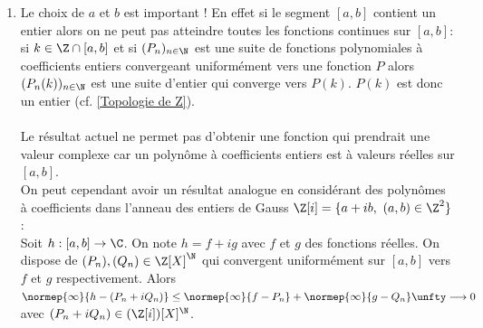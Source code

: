 \documentclass{book}
\begin{document}
\begin{enumerate}[leftmargin=*]
		\textit{Remarque : on aurait pu formuler la réponse à l'aide du théorème de la double limite.}
		\item Le choix de $a$ et $b$ est important ! En effet si le segment $[a,b]$ contient un entier alors on ne peut pas atteindre toutes les fonctions continues sur $[a,b]$:\\
		si $k\in \Z\cap[a,b]$ et si $(P_n)_{n\in \N}$ est une suite de fonctions polynomiales à coefficients entiers convergeant uniformément vers une fonction $P$ alors $(P_n(k))_{n\in \N}$ est une suite d'entier qui converge vers $P(k)$. $P(k)$ est donc un entier (cf. \ref{Topologie de Z}).\\\\
		Le résultat actuel ne permet pas d'obtenir une fonction qui prendrait une valeur complexe car un polynôme à coefficients entiers est à valeurs réelles sur $[a,b]$.\\
		On peut cependant avoir un résultat analogue en considérant des polynômes à coefficients dans l'anneau des entiers de Gauss $\Z[i]=\{a+ib,\ (a,b)\in \Z^2\}$ :\\
		Soit $h:[a,b]\to\C$. On note $h=f+ig$ avec $f$ et $g$ des fonctions réelles. On dispose de $(P_n),(Q_n)\in \Z[X]^\N$ qui convergent uniformément sur $[a,b]$ vers $f$ et $g$ respectivement. Alors $\normep{\infty}{h-(P_n+iQ_n)}\leq \normep{\infty}{f-P_n}+\normep{\infty}{g-Q_n}\unfty\longrightarrow0$ avec $(P_n+iQ_n)\in (\Z[i])[X]^\N$.
	\end{enumerate}
	
\end{document}
